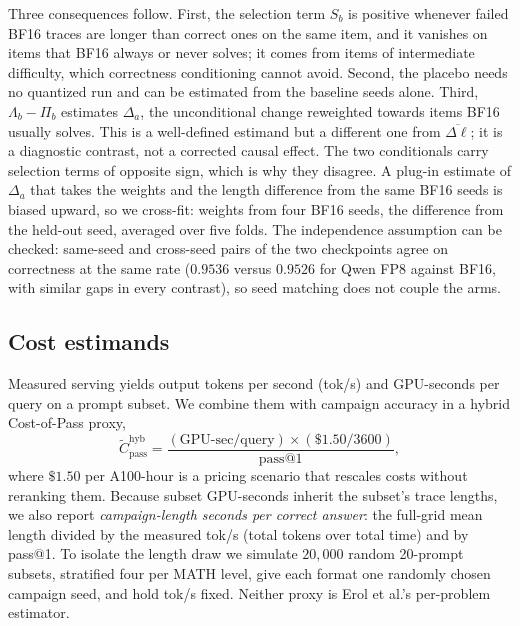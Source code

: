 \documentclass[11pt,a4paper]{article}
\begin{document}
Three consequences follow. First, the selection term $S_b$ is positive whenever failed BF16 traces are longer than correct ones on the same item, and it vanishes on items that BF16 always or never solves; it comes from items of intermediate difficulty, which correctness conditioning cannot avoid. Second, the placebo needs no quantized run and can be estimated from the baseline seeds alone. Third, $\Lambda_b-\Pi_b$ estimates $\Delta_a$, the unconditional change reweighted towards items BF16 usually solves. This is a well-defined estimand but a different one from $\overline{\Delta\ell}$; it is a diagnostic contrast, not a corrected causal effect. The two conditionals carry selection terms of opposite sign, which is why they disagree. A plug-in estimate of $\Delta_a$ that takes the weights and the length difference from the same BF16 seeds is biased upward, so we cross-fit: weights from four BF16 seeds, the difference from the held-out seed, averaged over five folds. The independence assumption can be checked: same-seed and cross-seed pairs of the two checkpoints agree on correctness at the same rate ($0.9536$ versus $0.9526$ for Qwen FP8 against BF16, with similar gaps in every contrast), so seed matching does not couple the arms.

\subsection{Cost estimands}
\label{sec:cost-def}
Measured serving yields output tokens per second (tok/s) and GPU-seconds per query on a prompt subset. We combine them with campaign accuracy in a hybrid Cost-of-Pass proxy,
\begin{equation}
\widetilde{C}_{\mathrm{pass}}^{\mathrm{hyb}} = \frac{(\text{GPU-sec/query})\times (\$1.50/3600)}{\mathrm{pass@1}},
\end{equation}
where $\$1.50$ per A100-hour is a pricing scenario that rescales costs without reranking them. Because subset GPU-seconds inherit the subset's trace lengths, we also report \emph{campaign-length seconds per correct answer}: the full-grid mean length divided by the measured tok/s (total tokens over total time) and by pass@1. To isolate the length draw we simulate $20{,}000$ random 20-prompt subsets, stratified four per MATH level, give each format one randomly chosen campaign seed, and hold tok/s fixed. Neither proxy is Erol et al.'s per-problem estimator.
\end{document}

